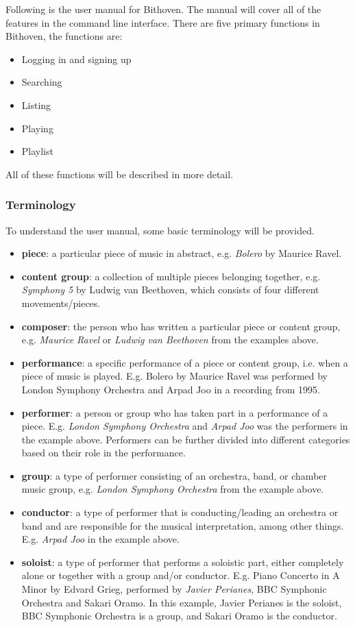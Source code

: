 Following is the user manual for Bithoven.
The manual will cover all of the features in the command line interface.
There are five primary functions in Bithoven, the functions are:
\begin{itemize}
    \item Logging in and signing up
    \item Searching
    \item Listing
    \item Playing
    \item Playlist
\end{itemize}
All of these functions will be described in more detail.

\subsubsection{Terminology}
To understand the user manual, some basic terminology will be provided.
\begin{itemize}
    \item \textbf{piece}: a particular piece of music in abstract, e.g. \emph{Bolero} by Maurice Ravel.
    \item \textbf{content group}: a collection of multiple pieces belonging together, e.g. \emph{Symphony 5} by Ludwig van Beethoven, which consists of four different movements/pieces.
    \item \textbf{composer}: the person who has written a particular piece or content group, e.g. \emph{Maurice Ravel} or \emph{Ludwig van Beethoven} from the examples above.
    \item \textbf{performance}: a specific performance of a piece or content group, i.e. when a piece of music is played. E.g. Bolero by Maurice Ravel was performed by London Symphony Orchestra and Arpad Joo in a recording from 1995.
    \item \textbf{performer}: a person or group who has taken part in a performance of a piece. E.g. \emph{London Symphony Orchestra} and \emph{Arpad Joo} was the performers in the example above. Performers can be further divided into different categories based on their role in the performance.
    \item \textbf{group}: a type of performer consisting of an orchestra, band, or chamber music group, e.g. \emph{London Symphony Orchestra} from the example above.
    \item \textbf{conductor}: a type of performer that is conducting/leading an orchestra or band and are responsible for the musical interpretation, among other things. E.g. \emph{Arpad Joo} in the example above.
    \item \textbf{soloist}: a type of performer that performs a soloistic part, either completely alone or together with a group and/or conductor. E.g. Piano Concerto in A Minor by Edvard Grieg, performed by \emph{Javier Perianes}, BBC Symphonic Orchestra and Sakari Oramo. In this example, Javier Perianes is the soloist, BBC Symphonic Orchestra is a group, and Sakari Oramo is the conductor.
\end{itemize}

